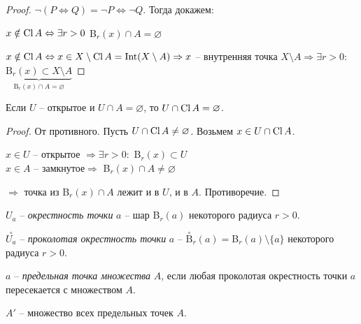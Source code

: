 \begin{proof}
    $\neg(P\Leftrightarrow Q)=\neg P\Leftrightarrow \neg Q$. Тогда докажем:

    $x\notin \operatorname{Cl} A\Leftrightarrow \exists r>0$ B$_r(x)\cap A=\varnothing$

    $x\notin \operatorname{Cl} A\Leftrightarrow x\in X\setminus \operatorname{Cl} A=\operatorname{Int} (X\setminus A)\Rightarrow x$ – внутренняя точка $X\setminus A\Rightarrow \exists r>0:$ $\underbrace{\text{B}_r(x)\subset X\setminus A}_{\text{B}_r(x)\cap A=\varnothing}$
\end{proof}

\begin{corollary}
    Если $U$ – открытое и $U\cap A=\varnothing$, то $U\cap \operatorname{Cl} A=\varnothing$.
\end{corollary}

\begin{proof}
    От противного. Пусть $U\cap \operatorname{Cl} A\neq\varnothing$. Возьмем $x\in U\cap \operatorname{Cl} A$.

    \begin{rcases}
        $x\in U$ – открытое $\Rightarrow\exists r>0:$ B$_r(x)\subset U$ \\
        $x\in A$ – замкнутое$\Rightarrow$ B$_r(x)\cap  A\neq \varnothing$
    \end{rcases} $\Rightarrow$ точка из B$_r(x)\cap A$ лежит и в $U$, и в $A$. Противоречие.
\end{proof}

\begin{definition}
    $U_a$ – \textit{окрестность точки} $a$  – шар B$_r(a)$ некоторого радиуса $r>0$.
\end{definition}

\begin{definition}
    $\overset{\circ}{U_a}$ – \textit{проколотая окрестность точки} $a$  – $\overset{\circ}{\text{B}}_r(a)=$B$_r(a)\setminus \{a\}$ некоторого радиуса $r>0$.
\end{definition}

\begin{definition}
    $a$ – \textit{предельная точка множества} $A$, если любая проколотая окрестность точки $a$ пересекается с множеством $A$.
\end{definition}

\begin{designation}
    $A'$ – множество всех предельных точек $A$.
\end{designation}

